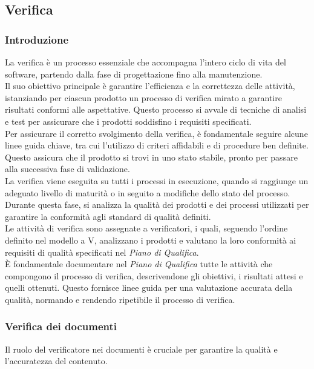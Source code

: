 \subsection{Verifica}
\label{subsec:verifica}

\subsubsection{Introduzione}
La verifica è un processo essenziale che accompagna l'intero ciclo di vita del software, partendo dalla fase di progettazione fino alla manutenzione. \\
Il suo obiettivo principale è garantire l'efficienza e la correttezza delle attività, istanziando per ciascun prodotto un processo di verifica mirato a garantire risultati conformi alle aspettative. Questo processo si avvale di tecniche di analisi e test per assicurare che i prodotti soddisfino i requisiti specificati. \\
Per assicurare il corretto svolgimento della verifica, è fondamentale seguire alcune linee guida chiave, tra cui l'utilizzo di criteri affidabili e di procedure ben definite. Questo assicura che il prodotto si trovi in uno stato stabile, pronto per passare alla successiva fase di validazione. \\
La verifica viene eseguita su tutti i processi in esecuzione, quando si raggiunge un adeguato livello di maturità o in seguito a modifiche dello stato del processo. Durante questa fase, si analizza la qualità dei prodotti e dei processi utilizzati per garantire la conformità agli standard di qualità definiti. \\
Le attività di verifica sono assegnate a verificatori, i quali, seguendo l'ordine definito nel modello a V, analizzano i prodotti e valutano la loro conformità ai requisiti di qualità specificati nel \textit{Piano di Qualifica}. \\ 
È fondamentale documentare nel \textit{Piano di Qualifica} tutte le attività che compongono il processo di verifica, descrivendone gli obiettivi, i risultati attesi e quelli ottenuti. Questo fornisce linee guida per una valutazione accurata della qualità, normando e rendendo ripetibile il processo di verifica.

\subsubsection{Verifica dei documenti}
\label{sec:verificatori}

Il ruolo del verificatore nei documenti è cruciale per garantire la qualità e l'accuratezza del contenuto.

